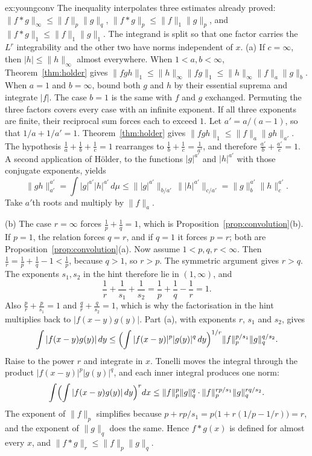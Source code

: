 \begin{solution}{ex:youngconv}
\idea The inequality interpolates three estimates already proved: $\|f*g\|_\infty\le\|f\|_p\|g\|_q$, $\|f*g\|_p\le\|f\|_1\|g\|_p$, and $\|f*g\|_1\le\|f\|_1\|g\|_1$. The integrand is split so that one factor carries the $L^r$ integrability and the other two have norms independent of $x$.
\writeup (a) If $c=\infty$, then $|h|\le\|h\|_\infty$ almost everywhere. When $1<a,b<\infty$, Theorem~\ref{thm:holder} gives $\|fgh\|_1\le\|h\|_\infty\|fg\|_1\le\|h\|_\infty\|f\|_a\|g\|_b$. When $a=1$ and $b=\infty$, bound both $g$ and $h$ by their essential suprema and integrate $|f|$. The case $b=1$ is the same with $f$ and $g$ exchanged. Permuting the three factors covers every case with an infinite exponent. If all three exponents are finite, their reciprocal sum forces each to exceed $1$. Let $a'=a/(a-1)$, so that $1/a+1/a'=1$. Theorem~\ref{thm:holder} gives $\|fgh\|_1\le\|f\|_a\|gh\|_{a'}$. The hypothesis $\frac1a+\frac1b+\frac1c=1$ rearranges to $\frac1b+\frac1c=\frac1{a'}$, and therefore $\frac{a'}b+\frac{a'}c=1$. A second application of Hölder, to the functions $|g|^{a'}$ and $|h|^{a'}$ with those conjugate exponents, yields
\[\|gh\|_{a'}^{a'}=\int|g|^{a'}|h|^{a'}\,d\mu\le\bigl\||g|^{a'}\bigr\|_{b/a'}\,\bigl\||h|^{a'}\bigr\|_{c/a'}=\|g\|_b^{a'}\|h\|_c^{a'}.\]
Take $a'$th roots and multiply by $\|f\|_a$.

(b) The case $r=\infty$ forces $\frac1p+\frac1q=1$, which is Proposition~\ref{prop:convolution}(b). If $p=1$, the relation forces $q=r$, and if $q=1$ it forces $p=r$; both are Proposition~\ref{prop:convolution}(a). Now assume $1<p,q,r<\infty$. Then $\frac1r=\frac1p+\frac1q-1<\frac1p$, because $q>1$, so $r>p$. The symmetric argument gives $r>q$. The exponents $s_1,s_2$ in the hint therefore lie in $(1,\infty)$, and
\[\frac1r+\frac1{s_1}+\frac1{s_2}=\frac1p+\frac1q-\frac1r=1.\]
Also $\frac pr+\frac p{s_1}=1$ and $\frac qr+\frac q{s_2}=1$, which is why the factorisation in the hint multiplies back to $|f(x-y)g(y)|$. Part (a), with exponents $r$, $s_1$ and $s_2$, gives
\[\int|f(x-y)g(y)|\,dy\le\Bigl(\int|f(x-y)|^p|g(y)|^q\,dy\Bigr)^{1/r}\|f\|_p^{p/s_1}\|g\|_q^{q/s_2}.\]
Raise to the power $r$ and integrate in $x$. Tonelli moves the integral through the product $|f(x-y)|^p|g(y)|^q$, and each inner integral produces one norm:
\[\int\Bigl(\int|f(x-y)g(y)|\,dy\Bigr)^r dx\le\|f\|_p^p\|g\|_q^q\cdot\|f\|_p^{rp/s_1}\|g\|_q^{rq/s_2}.\]
The exponent of $\|f\|_p$ simplifies because $p+rp/s_1=p\bigl(1+r(1/p-1/r)\bigr)=r$, and the exponent of $\|g\|_q$ does the same. Hence $f*g(x)$ is defined for almost every $x$, and $\|f*g\|_r\le\|f\|_p\|g\|_q$.
\end{solution}

